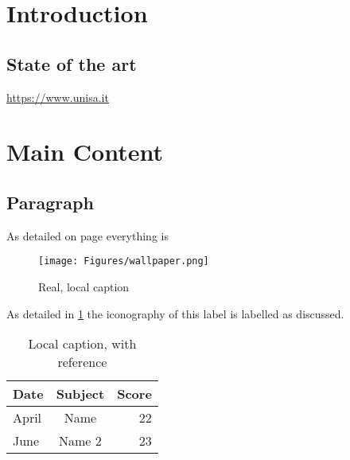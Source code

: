 \documentclass{article}
\begin{document}
\setcounter{page}{1}
\section{Introduction}\label{sec:intro}
\subsection{State of the art}
\url{https://www.unisa.it}

\section{Main Content}\label{sec:soa}
\subsection{Paragraph}\label{sec:par1}

As detailed on page \pageref{sec:intro} everything is

\begin{figure}[H]
    \centering
    \texttt{[image: Figures/wallpaper.png]}
    \caption[Optional caption]{Real, local caption}
    \label{fig:fig1}
\end{figure}
As detailed in \ref{fig:fig1} the iconography of this label is labelled
as discussed.

\begin{table}[H]
    \centering
    \label{tab:table1}
    \caption[This is optional caption, without reference]{Local caption, with reference}
    \begin{tabular}{ l c r }
        \bfseries{Date} & Subject & Score \\ \hline
        April & Name & 22 \\
        June & Name 2 & 23
    \end{tabular}
\end{table}
\end{document}
